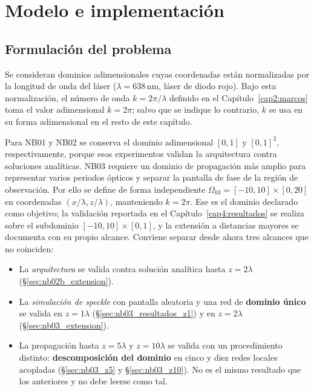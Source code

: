 \chapter{Modelo e implementación}\label{cap3:modelo}

\section{Formulación del problema}

Se consideran dominios adimensionales cuyas coordenadas están normalizadas por
la longitud de onda del láser ($\lambda = 638\,\mathrm{nm}$, láser de diodo
rojo). Bajo esta normalización, el número de onda
$k = 2\pi/\lambda$ definido en el Capítulo~\ref{cap2:marcos} toma el valor
adimensional $k = 2\pi$; salvo que se indique lo contrario, $k$ se usa en su
forma adimensional en el resto de este capítulo.

Para NB01 y NB02 se conserva el dominio adimensional $[0,1]$ y $[0,1]^2$,
respectivamente, porque esos experimentos validan la arquitectura contra
soluciones analíticas. NB03 requiere un dominio de propagación más amplio para
representar varios periodos ópticos y separar la pantalla de fase de la región
de observación. Por ello se define de forma independiente
$\Omega_{03}=[-10,10]\times[0,20]$ en coordenadas $(x/\lambda,z/\lambda)$,
manteniendo $k=2\pi$. Ese es el dominio declarado como objetivo; la validación
reportada en el Capítulo~\ref{cap4:resultados} se realiza sobre el subdominio
$[-10,10]\times[0,1]$, y la extensión a distancias mayores se documenta con su
propio alcance. Conviene separar desde ahora tres alcances que no coinciden:

\begin{itemize}
    \item La \emph{arquitectura} se valida contra solución analítica hasta
    $z=2\lambda$ (§\ref{sec:nb02b_extension}).
    \item La \emph{simulación de speckle} con pantalla aleatoria y una red de
    \textbf{dominio único} se valida en $z=1\lambda$
    (§\ref{sec:nb03_resultados_z1}) y en $z=2\lambda$
    (§\ref{sec:nb03_extension}).
    \item La propagación hasta $z=5\lambda$ y $z=10\lambda$ se valida con un
    procedimiento distinto: \textbf{descomposición del dominio} en cinco y diez
    redes locales acopladas (§\ref{sec:nb03_z5} y §\ref{sec:nb03_z10}). No es
    el mismo resultado que los anteriores y no debe leerse como tal.
\end{itemize}


